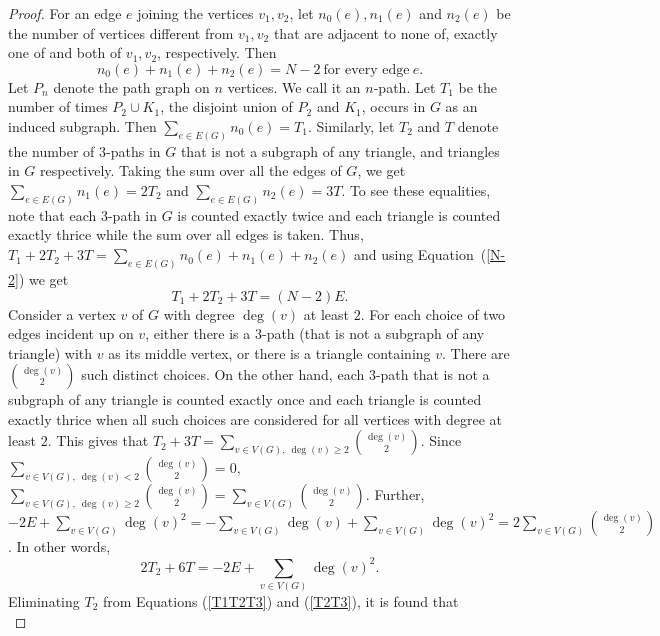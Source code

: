 \documentclass[12pt,a4paper]{article}
\theoremstyle{plain}
\numberwithin{equation}{section}
\begin{document}
  \begin{proof}
For an edge $e$ joining the vertices $v_1, v_2$, let $n_0 (e), n_1 (e)$ and $n_2 (e) $ be the number of vertices different from $v_1, v_2$ that are adjacent to none of, exactly one of and both of $v_1, v_2$, respectively. Then  \begin{equation}
	n_0 (e)+ n_1 (e)+n_2 (e) =N-2  ~\mbox{for every edge}~ e.
	\label{N-2}
\end{equation}
 Let $P_n$ denote the path  graph on $n$ vertices. We call it  an $n$-path. Let $T_1$ be the number of times  $P_2 \cup K_1 $, the disjoint union of $P_2$ and $K_1$,  occurs in $G$ as an induced subgraph. Then $\sum_{e \in E(G)} n_0 (e)=T_1$.
 Similarly, let $T_2$ and $T $ denote the number of $3$-paths in $G$ that is not a subgraph of any triangle, and triangles in $G$ respectively.  Taking the sum over all the edges of $G$, we get  $\sum_{e \in E(G)}n_1 (e) =2 T_2$ and  $\sum_{e \in E(G)}n_2 (e) = 3T$.  To see these equalities, note that each $3$-path in $G$ is counted exactly twice and each triangle is counted exactly thrice while the sum over all edges is taken. Thus, $ T_1 +2 T_2+3T  = \sum_{e \in E(G)}n_0 (e) + n_1 (e)+ n_2 (e)$ and using Equation~(\ref{N-2}) we get 
 \begin{equation}
T_1 + 2 T_2 +3 T  =(N-2)E.
\label{T1T2T3} 
\end{equation} 
Consider a vertex $v$ of $G$ with degree $\deg(v)$ at least $2$. For each choice of two edges incident up on $v$,   either there is a $3$-path (that is not a subgraph of any triangle) with $v$ as its  middle vertex, or there is a triangle containing $v$. There are $\binom{\deg(v)}{2}$ such distinct choices.  On the other hand, each $3$-path that is not a subgraph of any triangle is counted exactly once and each triangle is counted exactly thrice when all such choices are considered for all vertices with degree at least $2$. This gives that $	T_2 +3 T =\sum_{v \in V(G), ~\deg(v) \geq 2} \binom{\deg(v)}{2}.$    Since $ \sum_{v \in V(G), ~\deg(v) < 2} \binom{\deg(v)}{2}=0, $  $ \sum_{v \in V(G), ~\deg(v) \geq 2} \binom{\deg(v)}{2}= \sum_{v\in V(G)} \binom{\deg(v)}{2}$. Further, $-2E + \sum_{v\in V(G)}  \deg(v)^2 =-\sum_{v\in V(G)} \deg(v) + \sum_{v\in V(G)}  \deg(v)^2 = 2 \sum_{v\in V(G)}  \binom{\deg(v)}{2}$. In other words, 
 \begin{equation}
 2	T_2 +6 T  =-2 E +\sum_{v \in V(G)} \deg(v)^2.
	\label{T2T3}
\end{equation}
Eliminating $T_2$ from Equations (\ref{T1T2T3})  and (\ref{T2T3}), it is found that \begin{equation}

\end{equation}
\end{proof}
\end{document}
